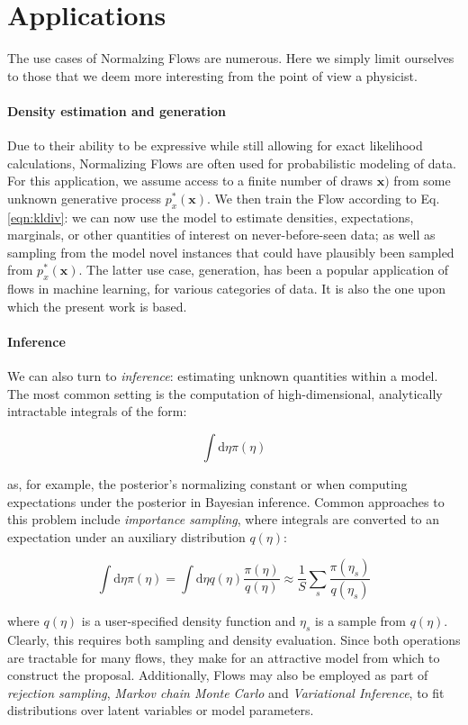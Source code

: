 \section{Applications}

The use cases of Normalzing Flows are numerous. 
Here we simply limit ourselves to those that we deem more interesting from the point of view a physicist.

\paragraph{Density estimation and generation}

Due to their ability to be expressive while still allowing for exact likelihood calculations, Normalizing Flows are often used for probabilistic modeling of data. For this application, we assume access to a finite number of draws $\mathbf{x})$ from some unknown generative process $p^*_x(\mathbf{x})$. We then train the Flow according to Eq. \ref{eqn:kldiv}: we can now use the model to estimate densities, expectations, marginals, or other quantities of interest on never-before-seen data; as well as sampling from the model novel instances that could have plausibly been sampled from $p^*_x(\mathbf{x})$. The latter use case, generation, has been a popular application of flows in machine learning, for various categories of data. It is also the one upon which the present work is based.

\paragraph{Inference}
We can also turn to \emph{inference}: estimating unknown quantities within a model. The most common setting is the computation of high-dimensional, analytically intractable integrals of the form: 

\[
\int \text{d}\eta \pi(\eta)
\]

as, for example, the posterior’s normalizing constant or when computing expectations under the posterior in Bayesian inference. Common approaches to this problem include \emph{importance sampling}, where integrals are converted to an expectation under an auxiliary distribution $q(\eta)$:

\[
\int \text{d}\eta \pi(\eta) = \int \text{d}\eta q(\eta) \frac{\pi(\eta)}{q(\eta)} \approx \frac{1}{S}\sum_s \frac{\pi(\eta_s)}{q(\eta_s)}
\]

where $q(\eta)$ is a user-specified density function and $\eta_s$ is a sample from $q(\eta)$. Clearly, this requires both sampling and density evaluation. Since both operations are tractable for many
flows, they make for an attractive model from which to construct the proposal.
Additionally, Flows may also be employed as part of \emph{rejection sampling}, \emph{Markov chain Monte Carlo} and \emph{Variational Inference}, to fit distributions over latent variables or model parameters.

